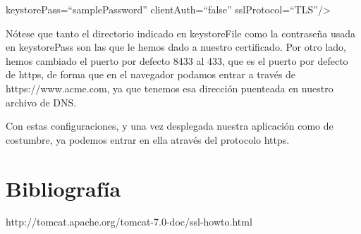 \documentclass[a4paper]{article}
\begin{document}
\noindent\colorbox{shadecolor}{keystorePass=``samplePassword'' clientAuth=``false'' sslProtocol=``TLS''/\textgreater }

Nótese que tanto el directorio indicado en keystoreFile como la contraseña usada en keystorePass son las que le hemos dado a nuestro certificado. Por otro lado, hemos cambiado el puerto por defecto 8433 al 433, que es el puerto por defecto de https, de forma que en el navegador podamos entrar a través de https://www.acme.com, ya que tenemos esa dirección puenteada en nuestro archivo de DNS.

Con estas configuraciones, y una vez desplegada nuestra aplicación como de costumbre, ya podemos entrar en ella através del protocolo https.

\section{Bibliografía}
http://tomcat.apache.org/tomcat-7.0-doc/ssl-howto.html
\end{document}
